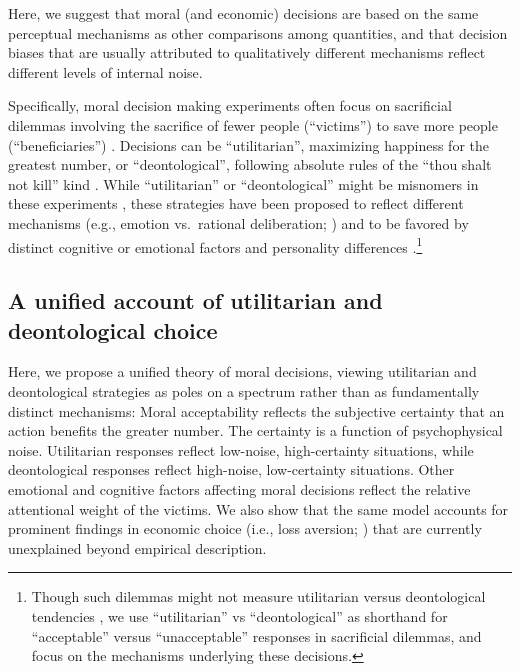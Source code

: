 \documentclass[
]{article}
\begin{document}
Here, we suggest that moral (and economic) decisions are based on the same perceptual mechanisms as other comparisons among quantities, and that decision biases that are usually attributed to qualitatively different mechanisms reflect different levels of internal noise.

Specifically, moral decision making experiments often focus on sacrificial dilemmas involving the sacrifice of fewer people (``victims'') to save more people (``beneficiaries'') \autocite{Greene2020,Kahane2018}. Decisions can be ``utilitarian'', maximizing happiness for the greatest number, or ``deontological'', following absolute rules of the ``thou shalt not kill'' kind \autocite{Alexander2021}. While ``utilitarian'' or ``deontological'' might be misnomers in these experiments \autocite{Bauman2014,Kahane2018}, these strategies have been proposed to reflect different mechanisms (e.g., emotion vs.~rational deliberation; \autocite{Greene2020}) and to be favored by distinct cognitive or emotional factors \autocite{Bartels2008,Bialek2021,Cushman2015,Cushman2006,Greene2001-moral,Schnall2008,Tremoliere2018,Valdesolo2006} and personality differences \autocite{Conway2013,Gleichgerrcht2013,Kahane2015}.\footnote{Though such dilemmas might not measure utilitarian versus deontological tendencies \autocite{Bauman2014,Kahane2015,Kahane2015a,Kahane2018}, we use ``utilitarian'' vs ``deontological'' as shorthand for ``acceptable'' versus ``unacceptable'' responses in sacrificial dilemmas, and focus on the mechanisms underlying these decisions.}

\subsection{A unified account of utilitarian and deontological choice}\label{a-unified-account-of-utilitarian-and-deontological-choice}

Here, we propose a unified theory of moral decisions, viewing utilitarian and deontological strategies as poles on a spectrum rather than as fundamentally distinct mechanisms: Moral acceptability reflects the subjective certainty that an action benefits the greater number. The certainty is a function of psychophysical noise. Utilitarian responses reflect low-noise, high-certainty situations, while deontological responses reflect high-noise, low-certainty situations. Other emotional and cognitive factors affecting moral decisions reflect the relative attentional weight of the victims. We also show that the same model accounts for prominent findings in economic choice (i.e., loss aversion; \autocite{Tversky1992}) that are currently unexplained beyond empirical description.
\end{document}
